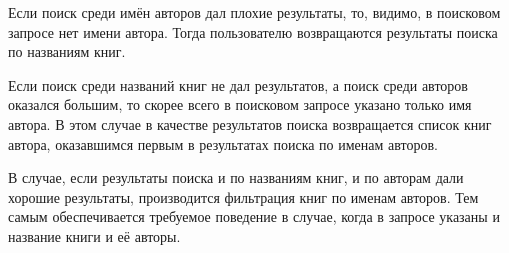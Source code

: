 Если поиск среди имён авторов дал плохие результаты, то, видимо, в поисковом запросе нет имени автора. Тогда пользователю возвращаются результаты поиска по названиям книг.

Если поиск среди названий книг не дал результатов, а поиск среди авторов оказался большим, то скорее всего в поисковом запросе указано только имя автора.
В этом случае в качестве результатов поиска возвращается список книг автора, оказавшимся первым в результатах поиска по именам авторов.

В случае, если результаты поиска и по названиям книг, и по авторам дали хорошие результаты, производится фильтрация книг по именам авторов.
Тем самым обеспечивается требуемое поведение в случае, когда в запросе указаны и название книги и её авторы.







